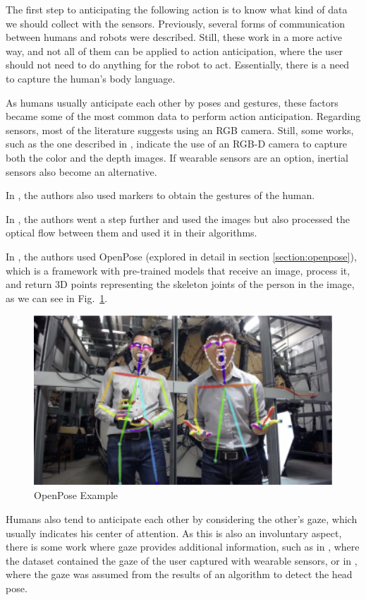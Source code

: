 The first step to anticipating the following action is to know what kind of data we should collect with the sensors. Previously, several forms of communication between humans and robots were described. Still, these work in a more active way, and not all of them can be applied to action anticipation, where the user should not need to do anything for the robot to act. Essentially, there is a need to capture the human's body language.

As humans usually anticipate each other by poses and gestures, these factors became some of the most common data to perform action anticipation. Regarding sensors, most of the literature suggests using an RGB camera. Still, some works, such as the one described in \cite{Moutinho2023}, indicate the use of an RGB-D camera to capture both the color and the depth images. If wearable sensors are an option, inertial sensors also become an alternative.

In \cite{Maeda2016}, the authors also used markers to obtain the gestures of the human.

In \cite{Gammulle2019, Wu2021, Rodriguez2019, Furnari2021}, the authors went a step further and used the images but also processed the optical flow between them and used it in their algorithms.

In \cite{Canuto2021}, the authors used OpenPose (explored in detail in section \ref{section:openpose}), which is a framework with pre-trained models that receive an image, process it, and return 3D points representing the skeleton joints of the person in the image, as we can see in Fig.~\ref{openpose}.

\begin{figure}[H]
\centerline{\includegraphics[width=4.5in]{figs/openpose.PNG}}
\caption{OpenPose Example\cite{Cao2021}}
\label{openpose}
\end{figure}

Humans also tend to anticipate each other by considering the other's gaze, which usually indicates his center of attention. As this is also an involuntary aspect, there is some work where gaze provides additional information, such as in \cite{Schydlo2018}, where the dataset contained the gaze of the user captured with wearable sensors, or in \cite{Canuto2021}, where the gaze was assumed from the results of an algorithm to detect the head pose.

